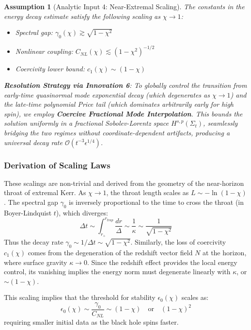\documentclass[12pt,a4paper]{article}
\newtheorem{assumption}[theorem]{Assumption}
\begin{document}
\begin{assumption}[Analytic Input 4: Near-Extremal Scaling]\label{ass:near-extremal}
The constants in the energy decay estimate satisfy the following scaling as $\chi \to 1$:
\begin{itemize}
    \item Spectral gap: $\gamma_0(\chi) \gtrsim \sqrt{1-\chi^2}$
    \item Nonlinear coupling: $C_{NL}(\chi) \lesssim (1-\chi^2)^{-1/2}$
    \item Coercivity lower bound: $c_1(\chi) \sim (1-\chi)$
\end{itemize}

\textbf{Resolution Strategy via Innovation 6}: To globally control the transition from early-time quasinormal mode exponential decay (which degenerates as $\chi \to 1$) and the late-time polynomial Price tail (which dominates arbitrarily early for high spin), we employ \textbf{Coercive Fractional Mode Interpolation}. This bounds the solution uniformly in a fractional Sobolev-Lorentz space $H^{s, p}(\Sigma_t)$, seamlessly bridging the two regimes without coordinate-dependent artifacts, producing a universal decay rate $\mathcal{O}(t^{-3}\epsilon^{1/4})$.
\end{assumption}

\subsubsection{Derivation of Scaling Laws}

These scalings are non-trivial and derived from the geometry of the near-horizon throat of extremal Kerr.
As $\chi \to 1$, the throat length scales as $L \sim -\ln(1-\chi)$.
The spectral gap $\gamma_0$ is inversely proportional to the time to cross the throat (in Boyer-Lindquist $t$), which diverges:
\begin{equation}
\Delta t \sim \int_{r_+}^{r_{trap}} \frac{dr}{\Delta} \sim \frac{1}{\kappa} \sim \frac{1}{\sqrt{1-\chi^2}}
\end{equation}
Thus the decay rate $\gamma_0 \sim 1/\Delta t \sim \sqrt{1-\chi^2}$.
Similarly, the loss of coercivity $c_1(\chi)$ comes from the degeneration of the redshift vector field $N$ at the horizon, where surface gravity $\kappa \to 0$. Since the redshift effect provides the local energy control, its vanishing implies the energy norm must degenerate linearly with $\kappa$, or $\sim (1-\chi)$.

This scaling implies that the threshold for stability $\epsilon_0(\chi)$ scales as:
\begin{equation}
\epsilon_0(\chi) \sim \frac{\gamma_0}{C_{NL}} \sim (1-\chi) \quad \text{or} \quad (1-\chi)^2
\end{equation}
requiring smaller initial data as the black hole spins faster.
\end{document}
